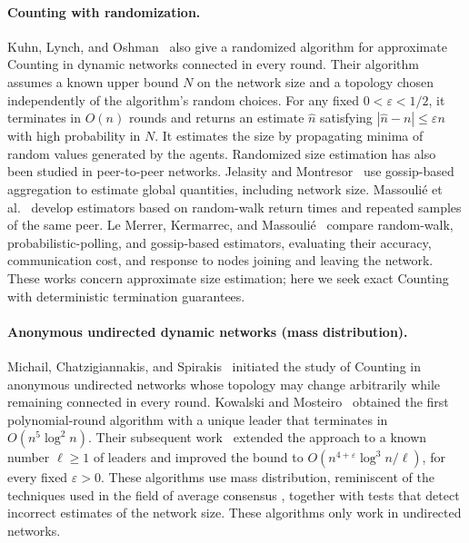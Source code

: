 \documentclass[11pt]{article}
\begin{document}
\paragraph{Counting with randomization.}
Kuhn, Lynch, and Oshman~\cite{KLO10} also give a randomized
algorithm for approximate Counting in dynamic networks connected
in every round. Their algorithm assumes a known upper bound
$N$ on the network size and a topology chosen independently
of the algorithm's random choices. For any fixed
$0<\varepsilon<1/2$, it terminates in $O(n)$ rounds and returns
an estimate $\widehat n$ satisfying
$|\widehat n-n|\leq\varepsilon n$ with high probability in $N$.
It estimates the size by propagating minima of random values
generated by the agents.
Randomized size estimation has also been studied in peer-to-peer
networks. Jelasity and Montresor~\cite{JM04} use gossip-based
aggregation to estimate global quantities, including network size.
Massouli\'e et al.~\cite{MLKG06} develop estimators based on
random-walk return times and repeated samples of the same peer.
Le Merrer, Kermarrec, and Massouli\'e~\cite{LKM06} compare
random-walk, probabilistic-polling, and gossip-based estimators,
evaluating their accuracy, communication cost, and response to
nodes joining and leaving the network.
These works concern approximate size estimation; here we seek
exact Counting with deterministic termination guarantees.

\paragraph{Anonymous undirected dynamic networks (mass distribution).}
Michail, Chatzigiannakis, and Spirakis~\cite{MCS13} initiated the study
of Counting in anonymous undirected networks whose topology may change arbitrarily
while remaining connected in every round. Kowalski and
Mosteiro~\cite{KM20} obtained the first polynomial-round algorithm with a unique leader
that terminates in \(O(n^5\log^2 n)\). Their subsequent work~\cite{KM22}
extended the approach to a known number \(\ell\geq1\) of leaders and
improved the bound to \(O(n^{4+\varepsilon}\log^3 n/\ell)\), for every
fixed \(\varepsilon>0\). These algorithms use mass distribution, reminiscent of the techniques used in the field of average consensus \cite{OT09,NOOT09}, together
with tests that detect incorrect estimates of the network size. These algorithms only work in undirected networks.
\end{document}
